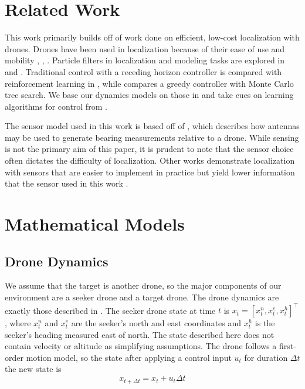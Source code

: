 \documentclass[10pt,twocolumn,letterpaper]{article}
\begin{document}
\section{Related Work}
This work primarily builds off of work done on efficient, low-cost localization with drones.
Drones have been used in localization because of their ease of use and mobility \cite{dronehunter}, \cite{kyle1}, \cite{learning_to_seek}.
Particle filters in localization and modeling tasks are explored in \cite{dronehunter} and \cite{kyle1}.
Traditional control with a receding horizon controller is compared with reinforcement learning in \cite{kyle1}, while \cite{dronehunter} compares a greedy controller with Monte Carlo tree search.
We base our dynamics models on those in \cite{dronehunter} and take cues on learning algorithms for control from \cite{kyle1}.

The sensor model used in this work is based off of \cite{sensor_modality}, which describes how antennas may be used to generate bearing measurements relative to a drone.
While sensing is not the primary aim of this paper, it is prudent to note that the sensor choice often dictates the difficulty of localization.
Other works demonstrate localization with sensors that are easier to implement in practice but yield lower information that the sensor used in this work \cite{fov}.


\section{Mathematical Models}
\label{sec:models}

\subsection{Drone Dynamics}
We assume that the target is another drone, so the major components of our environment are a seeker drone and a target drone.
The drone dynamics are exactly those described in \cite{dronehunter}.
The seeker drone state at time $t$ is $x_t = [x_t^n, x_t^e, x_t^h]^\intercal$, where $x_t^n$ and $x_t^e$ are the seeker's north and east coordinates and $x_t^h$ is the seeker's heading measured east of north.
The state described here does not contain velocity or altitude as simplifying assumptions.
The drone follows a first-order motion model, so the state after applying a control input $u_t$ for duration $\Delta t$ the new state is
\begin{equation}
x_{t + \Delta t} = x_t + u_t\Delta t
\end{equation}
\end{document}
